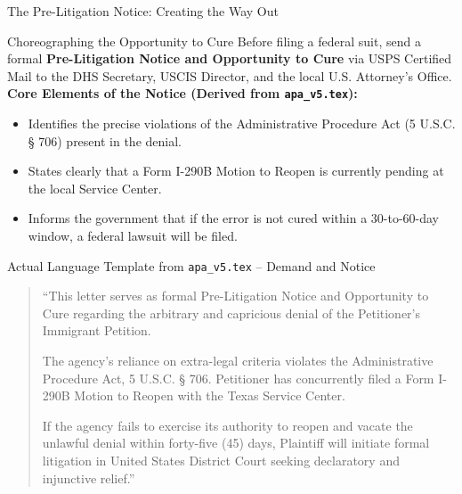\documentclass[11pt]{beamer}
\begin{document}
	
	\begin{frame}[allowframebreaks]{The Pre-Litigation Notice: Creating the Way Out}
		\scriptsize
		\begin{block}{Choreographing the Opportunity to Cure}
			Before filing a federal suit, send a formal \textbf{Pre-Litigation Notice and Opportunity to Cure} via USPS Certified Mail to the DHS Secretary, USCIS Director, and the local U.S. Attorney's Office.
			\vspace{0.15cm}
			\textbf{Core Elements of the Notice (Derived from \texttt{apa\_v5.tex}):}
			\begin{itemize}
				\item Identifies the precise violations of the Administrative Procedure Act (5 U.S.C. § 706) present in the denial.
				\item States clearly that a Form I-290B Motion to Reopen is currently pending at the local Service Center.
				\item Informs the government that if the error is not cured within a 30-to-60-day window, a federal lawsuit will be filed.
			\end{itemize}
		\end{block}
		\framebreak
		\begin{block}{Actual Language Template from \texttt{apa\_v5.tex} -- Demand and Notice}
			\begin{quote}
				``This letter serves as formal Pre-Litigation Notice and Opportunity to Cure regarding the arbitrary and capricious denial of the Petitioner's Immigrant Petition. 
				
				The agency's reliance on extra-legal criteria violates the Administrative Procedure Act, 5 U.S.C. § 706. Petitioner has concurrently filed a Form I-290B Motion to Reopen with the Texas Service Center. 
				
				If the agency fails to exercise its authority to reopen and vacate the unlawful denial within forty-five (45) days, Plaintiff will initiate formal litigation in United States District Court seeking declaratory and injunctive relief.''
			\end{quote}
		\end{block}
	\end{frame}
	
\end{document}
